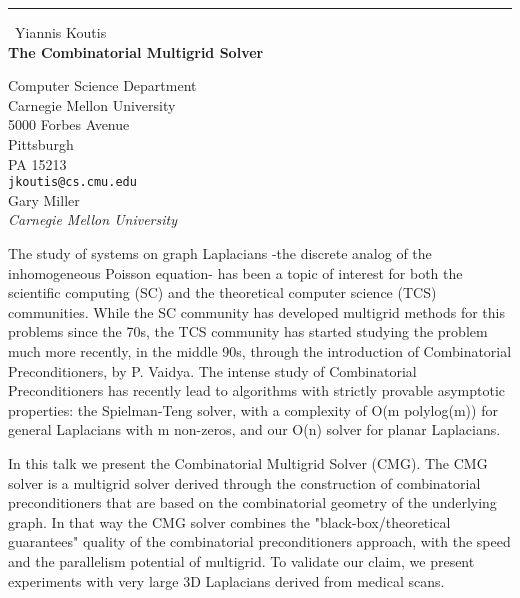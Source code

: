 \documentclass{report}
\begin{document}
\begin{center}
\rule{6in}{1pt} \
{\large Yiannis Koutis \\
{\bf The Combinatorial Multigrid Solver}}

Computer Science Department \\ Carnegie Mellon University \\ 5000 Forbes Avenue \\ Pittsburgh \\ PA 15213
\\
{\tt jkoutis@cs.cmu.edu}\\
Gary Miller\\
{\em Carnegie Mellon University}\end{center}

The study of systems on graph Laplacians -the discrete analog of the
inhomogeneous Poisson equation- has been a topic of interest for both the
scientific computing (SC) and the theoretical computer science (TCS)
communities. While the SC community has developed multigrid methods for
this problems since the 70s, the TCS community has started studying the
problem much more recently, in the middle 90s, through the introduction
of Combinatorial Preconditioners, by P. Vaidya. The intense study of
Combinatorial Preconditioners has recently lead to algorithms with
strictly provable asymptotic properties: the Spielman-Teng solver, with a
complexity of O(m polylog(m)) for general Laplacians with m non-zeros,
and our O(n) solver for planar Laplacians.

In this talk we present the Combinatorial Multigrid Solver (CMG). The CMG
solver is a multigrid solver derived through the construction of
combinatorial preconditioners that are based on the combinatorial
geometry of the underlying graph. In that way the CMG solver combines the
"black-box/theoretical guarantees" quality of the combinatorial
preconditioners approach, with the speed and the parallelism potential of
multigrid. To validate our claim, we present experiments with very large
3D Laplacians derived from medical scans.
\end{document}
